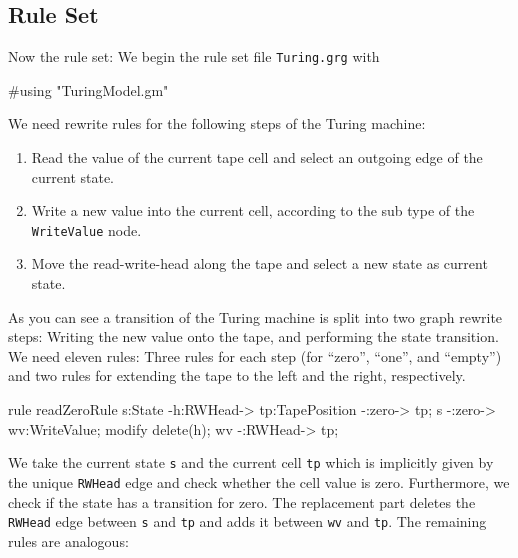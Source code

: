 \subsection{Rule Set}
Now the rule set: We begin the rule set file \texttt{Turing.grg} with

\begin{grgen}[firstnumber=1]
#using "TuringModel.gm"

\end{grgen}
We need rewrite rules for the following steps of the Turing machine:
\begin{enumerate}
  \item Read the value of the current tape cell and select an outgoing edge of the current state.
  \item Write a new value into the current cell, according to the sub type of the \texttt{WriteValue} node.
  \item Move the read-write-head along the tape and select a new state as current state.
\end{enumerate}
As you can see a transition of the Turing machine is split into two graph rewrite steps:
Writing the new value onto the tape, and performing the state transition.
We need eleven rules: Three rules for each step (for ``zero'', ``one'', and ``empty'') and two rules for extending the tape to the left and the right, respectively.
\begin{grgen}[firstnumber=last]
rule readZeroRule {
	s:State -h:RWHead-> tp:TapePosition -:zero-> tp;
	s -:zero-> wv:WriteValue;
	modify {
		delete(h);
		wv -:RWHead-> tp;
	}
}
\end{grgen}

We take the current state \texttt{s} and the current cell \texttt{tp} which is implicitly given by the unique \texttt{RWHead} edge and check whether the cell value is zero.
Furthermore, we check if the state has a transition for zero. 
The replacement part deletes the \texttt{RWHead} edge between \texttt{s} and \texttt{tp} and adds it between \texttt{wv} and \texttt{tp}. 
The remaining rules are analogous:


